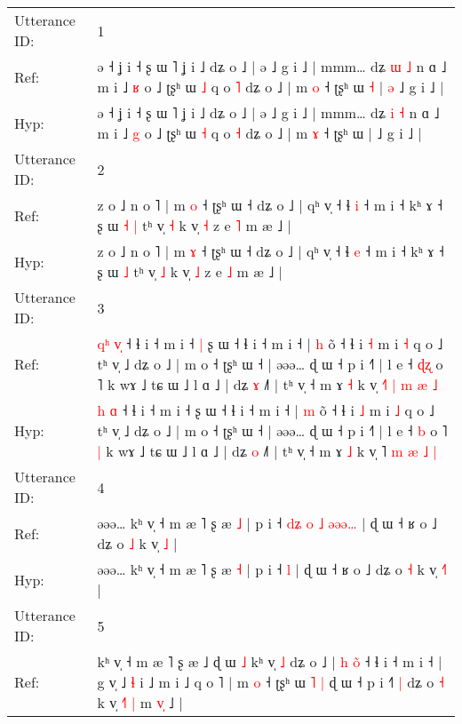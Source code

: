 \documentclass[10pt]{article}
\DeclareRobustCommand{\hl}[1]{{\textcolor{red}{#1}}}
\begin{document}
\begin{longtable}{ll}
\toprule
Utterance ID: & 1 \\
Ref: & ə ˧ ʝ i ˧ ʂ ɯ ˥ ʝ i ˩ dʑ o ˩ | ə ˩ g i ˩ | mmm… dʑ \hl{ɯ} \hl{˩} n ɑ ˩ m i ˩ \hl{ʁ} o ˩ ʈʂʰ ɯ \hl{˩} q o \hl{˥} dʑ o ˩ | m \hl{o} ˧ ʈʂʰ ɯ\hl{ }\hl{˧} |\hl{ }\hl{ə} ˩ g i ˩ |
 \\
Hyp: & ə ˧ ʝ i ˧ ʂ ɯ ˥ ʝ i ˩ dʑ o ˩ | ə ˩ g i ˩ | mmm… dʑ \hl{i} \hl{˧} n ɑ ˩ m i ˩ \hl{g} o ˩ ʈʂʰ ɯ \hl{˧} q o \hl{˧} dʑ o ˩ | m \hl{ɤ} ˧ ʈʂʰ ɯ\hl{}\hl{} |\hl{}\hl{} ˩ g i ˩ |
 \\
\midrule
Utterance ID: & 2 \\
Ref: & z o ˩ n o ˥ | m \hl{o} ˧ ʈʂʰ ɯ ˧ dʑ o ˩ | qʰ v̩ ˧ ɬ \hl{i} ˧ m i ˧ kʰ ɤ ˧ ʂ ɯ\hl{ }\hl{˧} \hl{|} tʰ v̩ \hl{˧} k v̩ \hl{˧} z e \hl{˥} m æ ˩ |
 \\
Hyp: & z o ˩ n o ˥ | m \hl{ɤ} ˧ ʈʂʰ ɯ ˧ dʑ o ˩ | qʰ v̩ ˧ ɬ \hl{e} ˧ m i ˧ kʰ ɤ ˧ ʂ ɯ\hl{}\hl{} \hl{˩} tʰ v̩ \hl{˩} k v̩ \hl{˩} z e \hl{˩} m æ ˩ |
 \\
\midrule
Utterance ID: & 3 \\
Ref: & \hl{q}\hl{ʰ} \hl{v}\hl{̩} ˧ ɬ i ˧ m i ˧\hl{ }\hl{|} ʂ ɯ ˧ ɬ i ˧ m i ˧ | \hl{h} õ ˧ ɬ i \hl{˧} m i \hl{˧} q o ˩ tʰ v̩ ˩ dʑ o ˩ | m o ˧ ʈʂʰ ɯ ˧ | əəə… ɖ ɯ ˧ p i ˧˥ | l e ˧ \hl{ɖ}\hl{ʐ} o ˥\hl{}\hl{} k wɤ ˩ tɕ ɯ ˩ l ɑ ˩ | dʑ \hl{ɤ} ˩˥ | tʰ v̩ ˧ m ɤ \hl{˧} k v̩ \hl{˧}˥ \hl{|} \hl{m} \hl{æ} \hl{˩}
 \\
Hyp: & \hl{}\hl{h} \hl{}\hl{ɑ} ˧ ɬ i ˧ m i ˧\hl{}\hl{} ʂ ɯ ˧ ɬ i ˧ m i ˧ | \hl{m} õ ˧ ɬ i \hl{˩} m i \hl{˩} q o ˩ tʰ v̩ ˩ dʑ o ˩ | m o ˧ ʈʂʰ ɯ ˧ | əəə… ɖ ɯ ˧ p i ˧˥ | l e ˧ \hl{}\hl{b} o ˥\hl{ }\hl{|} k wɤ ˩ tɕ ɯ ˩ l ɑ ˩ | dʑ \hl{o} ˩˥ | tʰ v̩ ˧ m ɤ \hl{˩} k v̩ \hl{}˥ \hl{m} \hl{æ} \hl{˩} \hl{|}
 \\
\midrule
Utterance ID: & 4 \\
Ref: & əəə… kʰ v̩ ˧ m æ ˥ ʂ æ \hl{˩} | p i ˧\hl{ }\hl{d}\hl{ʑ}\hl{ }\hl{o}\hl{ }\hl{˩} \hl{ə}\hl{ə}\hl{ə}\hl{…} | ɖ ɯ ˧ ʁ o ˩ dʑ o \hl{˩} k v̩ \hl{}\hl{˩} |
 \\
Hyp: & əəə… kʰ v̩ ˧ m æ ˥ ʂ æ \hl{˧} | p i ˧\hl{}\hl{}\hl{}\hl{}\hl{}\hl{}\hl{} \hl{}\hl{}\hl{}\hl{l} | ɖ ɯ ˧ ʁ o ˩ dʑ o \hl{˧} k v̩ \hl{˧}\hl{˥} |
 \\
\midrule
Utterance ID: & 5 \\
Ref: & kʰ v̩ ˧ m æ ˥ ʂ æ ˩\hl{}\hl{} ɖ ɯ \hl{˩} kʰ v̩\hl{}\hl{}\hl{} \hl{˩} dʑ o ˩ | \hl{h} \hl{o}\hl{̃} ˧ ɬ i ˧ m i ˧ | g v̩ ˩ \hl{ɬ} i ˩ m i ˩ q o ˥ | m \hl{}\hl{o} ˧ ʈʂʰ ɯ\hl{ }\hl{˥} \hl{|} ɖ ɯ ˧ p i ˧\hl{˥}\hl{ }\hl{|} dʑ o \hl{˧} k v̩\hl{ }\hl{˧}\hl{˥} \hl{|} m \hl{v}\hl{̩} ˩ |

\end{longtable}
\end{document}
